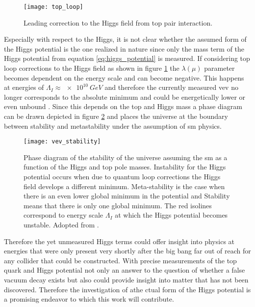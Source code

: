 \begin{figure}
    \centering
    \texttt{[image: top\_loop]}
        \caption[]{Leading correction to the Higgs field from top pair interaction.}
    \label{fig:top_loop}    
\end{figure}
Especially with respect to the Higgs, it is not clear whether the assumed form of the Higgs potential is the one realized in nature since only the mass term of the Higgs potential from equation \ref{eq:higgs_potential} is measured. If considering top loop corrections to the Higgs field as shown in figure \ref{fig:top_loop} the $\lambda(\mu)$ parameter becomes dependent on the energy scale and can become negative. This happens at energies of $\Lambda_I\approx \qty[]{e10}{GeV}$ and therefore the currently measured \ac{vev} no longer corresponds to the absolute minimum and could be energetically lower or even unbound \citep{devoto2022false}. Since this depends on the top and Higgs mass a phase diagram can be drawn depicted in figure \ref{fig:vev_stability} and places the universe at the boundary between stability and metastability under the assumption of \ac{sm} physics.

\begin{figure}
    \centering
    \texttt{[image: vev\_stability]}
    \caption[]{Phase diagram of the stability of the universe assuming the \ac{sm} as a function of the Higgs and top pole masses. Instability for the Higgs potential occurs when due to quantum loop corrections the Higgs field develops a different minimum. Meta-stability is the case when there is an even lower global minimum in the potential and Stability means that there is only one global minimum. The red isolines correspond to energy scale $\Lambda_I$ at which the Higgs potential becomes unstable. Adopted from \citep{Buttazzo:2013uya}.} 
    \label{fig:vev_stability}
\end{figure}

Therefore the yet unmeasured Higgs terms could offer insight into physics at energies that were only present very shortly after the big bang far out of reach for any collider that could be constructed. With precise measurements of the top quark and Higgs potential not only an answer to  the question of whether a false vacuum decay exists but also could provide insight into matter that has not been discovered. Therefore the investigation of athe ctual form of the Higgs potential is a promising endeavor to which this work will contribute.

